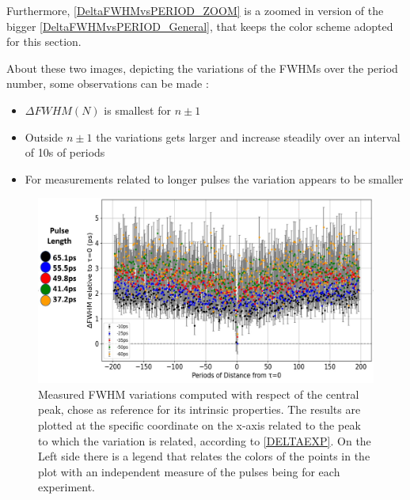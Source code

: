Furthermore, \autoref{DeltaFWHMvsPERIOD_ZOOM} is a zoomed in version of the bigger \autoref{DeltaFWHMvsPERIOD_General}, that keeps the color scheme adopted for this section.

About these two images, depicting the variations of the FWHMs over the period number, some observations can be made :

\begin{itemize}
\item $\Delta FWHM(N)$ is smallest for $n \pm 1$
\item Outside $n \pm 1$ the variations gets larger and increase steadily over an interval of 10s of periods
\item For measurements related to longer pulses the variation appears to be smaller		
\end{itemize}



\begin{figure}[hbtp]
\centering
\includegraphics[width=1\textwidth]{DeltaFWHMvsPeriods.jpg}
\caption{Measured FWHM variations computed with respect of the central peak, chose as reference for its intrinsic properties. The results are plotted at the specific coordinate on the x-axis related to the peak to which the variation is related, according to \autoref{DELTAEXP}. On the Left side there is a legend that relates the colors of the points in the plot with an independent measure of the pulses being for each experiment.}
\label{DeltaFWHMvsPERIOD_General}
\end{figure}

